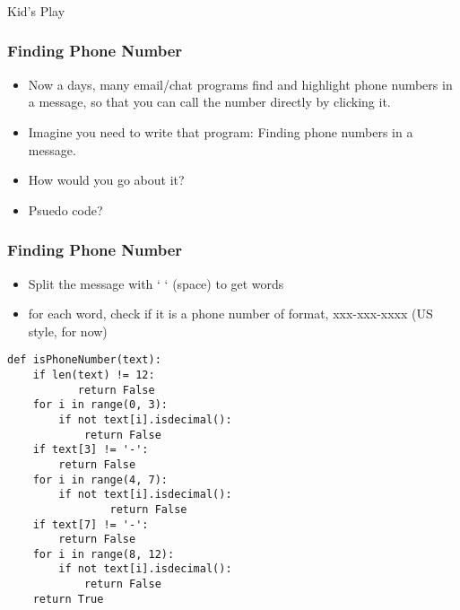 \begin{frame}[fragile]\frametitle{}
\begin{center}
{\Large Kid's Play}
\end{center}
\end{frame}



\begin{frame}[fragile]\frametitle{Finding Phone Number}
\begin{itemize}
\item Now a days, many email/chat programs find and highlight phone numbers in a message, so that you can call the number directly by clicking it.
\item Imagine you need to write that program: Finding phone numbers in a message.
\item How would you go about it?
\item Psuedo code?
\end{itemize}
\end{frame}

\begin{frame}[fragile]\frametitle{Finding Phone Number}
\begin{itemize}
\item Split the message with ` ` (space) to get words
\item for each word, check if it is a phone number of format, xxx-xxx-xxxx (US style, for now)
\end{itemize}
\begin{lstlisting}
def isPhoneNumber(text):
	if len(text) != 12:
           return False
	for i in range(0, 3):
		if not text[i].isdecimal():
			return False
	if text[3] != '-':
		return False
	for i in range(4, 7):
		if not text[i].isdecimal():
               	return False
	if text[7] != '-':
		return False
	for i in range(8, 12):
		if not text[i].isdecimal():
			return False
	return True
\end{lstlisting}
\end{frame}

